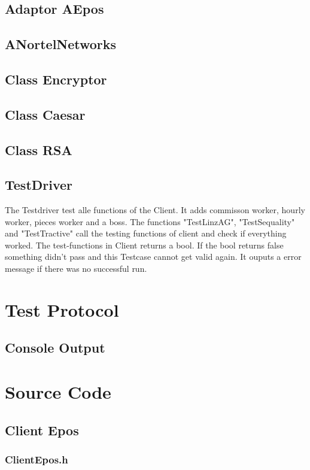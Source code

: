 \subsection{Adaptor AEpos}
\subsection{ANortelNetworks}

\subsection{Class Encryptor}
\subsection{Class Caesar}
\subsection{Class RSA}

\subsection{TestDriver}
The Testdriver test alle functions of the Client. It adds commisson worker, hourly worker, pieces worker and a boss.
The functions "TestLinzAG", "TestSequality" and "TestTractive" call the testing functions of client and check if everything worked.
The test-functions in Client returns a bool. If the bool returns false something didn't pass and this Testcase cannot get valid again.
It ouputs a error message if there was no successful run.

\newpage
\section{Test Protocol}


\subsection{Console Output}


\section{Source Code}

\subsection{Client Epos}
\subsubsection{ClientEpos.h}
